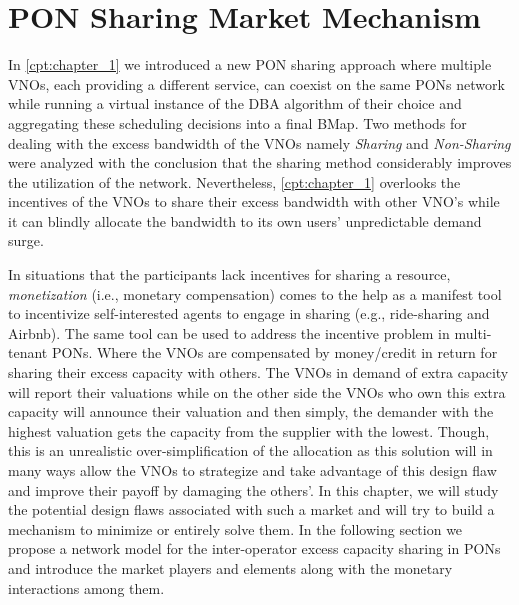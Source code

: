 \chapter*{PON Sharing Market Mechanism}


In \autoref{cpt:chapter_1} we introduced a new \ac{PON} sharing approach where multiple \acfp{VNO}, each providing a different service, can coexist on the same \acp{PON} network while running a virtual instance of the \ac{DBA} algorithm of their choice and aggregating these scheduling decisions into a final \ac{BMap}. Two methods for dealing with the excess bandwidth of the \acp{VNO} namely \textit{Sharing} and \textit{Non-Sharing} were analyzed with the conclusion that the sharing method considerably improves the utilization of the network. Nevertheless, \autoref{cpt:chapter_1} overlooks the incentives of the \acp{VNO} to share their excess bandwidth with other \ac{VNO}'s while it can blindly allocate the bandwidth to its own users' unpredictable demand surge.

In situations that the participants lack incentives for sharing a resource, \textit{monetization} (i.e., monetary compensation) comes to the help as a manifest tool to incentivize self-interested agents to engage in sharing (e.g., ride-sharing and Airbnb). The same tool can be used to address the incentive problem in multi-tenant \acp{PON}. Where the \acp{VNO} are compensated by money/credit in return for sharing their excess capacity with others. The \acp{VNO} in demand of extra capacity will report their valuations while on the other side the \acp{VNO} who own this extra capacity will announce their valuation and then simply, the demander with the highest valuation gets the capacity from the supplier with the lowest. Though, this is an unrealistic over-simplification of the allocation as this solution will in many ways allow the \acp{VNO} to strategize and take advantage of this design flaw and improve their payoff by damaging the others'. In this chapter, we will study the potential design flaws associated with such a market and will try to build a mechanism to minimize or entirely solve them. In the following section we propose a network model for the inter-operator excess capacity sharing in \acp{PON} and introduce the market players and elements along with the monetary interactions among them.


